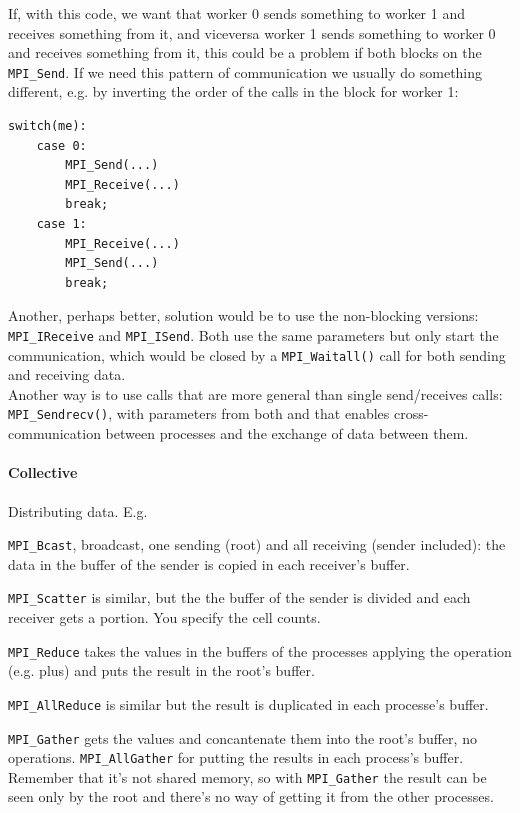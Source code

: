 \documentclass[10pt]{report}
\begin{document}
If, with this code, we want that worker 0 sends something to worker 1 and receives something from it, and viceversa worker 1 sends something to worker 0 and receives something from it, this could be a problem if both blocks on the \texttt{MPI\_Send}. If we need this pattern of communication we usually do something different, e.g. by inverting the order of the calls in the block for worker 1:
\begin{lstlisting}[style=myC]
switch(me):
	case 0:
		MPI_Send(...)
		MPI_Receive(...)
		break;
	case 1:
		MPI_Receive(...)
		MPI_Send(...)
		break;
\end{lstlisting}
Another, perhaps better, solution would be to use the non-blocking versions: \texttt{MPI\_IReceive} and \texttt{MPI\_ISend}. Both use the same parameters but only start the communication, which would be closed by a \texttt{MPI\_Waitall()} call for both sending and receiving data.\\
Another way is to use calls that are more general than single send/receives calls: \texttt{MPI\_Sendrecv()}, with parameters from both and that enables cross-communication between processes and the exchange of data between them.
\paragraph{Collective} Distributing data. E.g.
\begin{list}{}{}
	\item \texttt{MPI\_Bcast}, broadcast, one sending (root) and all receiving (sender included): the data in the buffer of the sender is copied in each receiver's buffer.
	\item \texttt{MPI\_Scatter} is similar, but the the buffer of the sender is divided and each receiver gets a portion. You specify the cell counts.
	\item \texttt{MPI\_Reduce} takes the values in the buffers of the processes applying the operation (e.g. plus) and puts the result in the root's buffer.
	\item \texttt{MPI\_AllReduce} is similar but the result is duplicated in each processe's buffer.
	\item \texttt{MPI\_Gather} gets the values and concantenate them into the root's buffer, no operations. \texttt{MPI\_AllGather} for putting the results in each process's buffer. Remember that it's not shared memory, so with \texttt{MPI\_Gather} the result can be seen only by the root and there's no way of getting it from the other processes.
\end{list}
\end{document}
